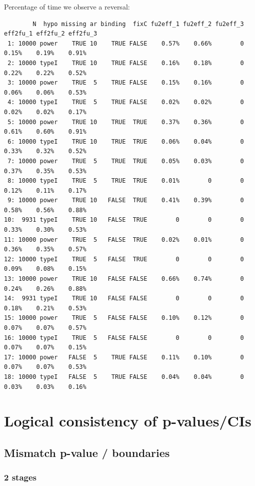 \documentclass[12pt]{article}
\begin{document}
Percentage of time we observe a reversal:
\begin{verbatim}
        N  hypo missing ar binding  fixC fu2eff_1 fu2eff_2 fu2eff_3 eff2fu_1 eff2fu_2 eff2fu_3
 1: 10000 power    TRUE 10    TRUE FALSE    0.57%    0.66%        0    0.15%    0.19%    0.91%
 2: 10000 typeI    TRUE 10    TRUE FALSE    0.16%    0.18%        0    0.22%    0.22%    0.52%
 3: 10000 power    TRUE  5    TRUE FALSE    0.15%    0.16%        0    0.06%    0.06%    0.53%
 4: 10000 typeI    TRUE  5    TRUE FALSE    0.02%    0.02%        0    0.02%    0.02%    0.17%
 5: 10000 power    TRUE 10    TRUE  TRUE    0.37%    0.36%        0    0.61%    0.60%    0.91%
 6: 10000 typeI    TRUE 10    TRUE  TRUE    0.06%    0.04%        0    0.33%    0.32%    0.52%
 7: 10000 power    TRUE  5    TRUE  TRUE    0.05%    0.03%        0    0.37%    0.35%    0.53%
 8: 10000 typeI    TRUE  5    TRUE  TRUE    0.01%        0        0    0.12%    0.11%    0.17%
 9: 10000 power    TRUE 10   FALSE  TRUE    0.41%    0.39%        0    0.58%    0.56%    0.88%
10:  9931 typeI    TRUE 10   FALSE  TRUE        0        0        0    0.33%    0.30%    0.53%
11: 10000 power    TRUE  5   FALSE  TRUE    0.02%    0.01%        0    0.36%    0.35%    0.57%
12: 10000 typeI    TRUE  5   FALSE  TRUE        0        0        0    0.09%    0.08%    0.15%
13: 10000 power    TRUE 10   FALSE FALSE    0.66%    0.74%        0    0.24%    0.26%    0.88%
14:  9931 typeI    TRUE 10   FALSE FALSE        0        0        0    0.18%    0.21%    0.53%
15: 10000 power    TRUE  5   FALSE FALSE    0.10%    0.12%        0    0.07%    0.07%    0.57%
16: 10000 typeI    TRUE  5   FALSE FALSE        0        0        0    0.07%    0.07%    0.15%
17: 10000 power   FALSE  5    TRUE FALSE    0.11%    0.10%        0    0.07%    0.07%    0.53%
18: 10000 typeI   FALSE  5    TRUE FALSE    0.04%    0.04%        0    0.03%    0.03%    0.16%
\end{verbatim}


\clearpage

\section{Logical consistency of p-values/CIs}
\label{sec:orgaa659f9}

\subsection{Mismatch p-value / boundaries}
\label{sec:org063f6f5}
\subsubsection{2 stages}
\label{sec:orgc7b1f98}
\end{document}
